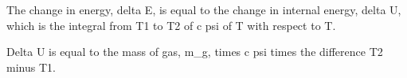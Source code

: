 The change in energy, delta E, is equal to the change in internal energy, delta U, which is the integral from T1 to T2 of c psi of T with respect to T.

Delta U is equal to the mass of gas, m_g, times c psi times the difference T2 minus T1.